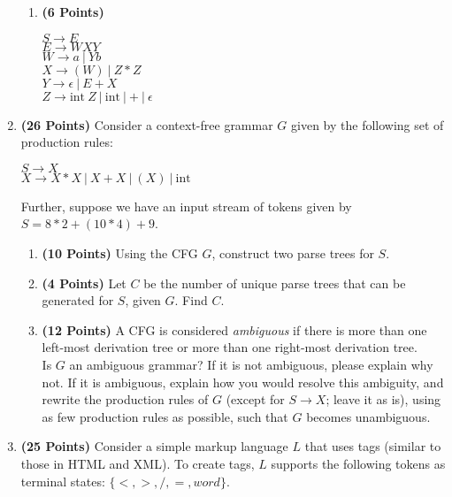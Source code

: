 \documentclass{article}[12pt]
\begin{document}
\begin{enumerate}
\begin{enumerate}
        \item \textbf{(6 Points)}
        \begin{center}
            $S \rightarrow E$\\
            $E \rightarrow WXY$\\
            $W \rightarrow a~|~Yb~$\\
            $X \rightarrow ( W )~|~Z * Z$\\
            $Y \rightarrow \epsilon~|~E + X$\\
            $Z \rightarrow \mathrm{int}~Z~|~\mathrm{int}~| + |~\epsilon$
        \end{center}
    \end{enumerate}

    \pagebreak
    \item \textbf{(26 Points)} Consider a context-free grammar $G$ given by the following set of production rules:
    \begin{center}
        $S \rightarrow X$\\
        $X \rightarrow X * X~|~X + X~|~( X )~|~\mathrm{int}$
    \end{center}
    Further, suppose we have an input stream of tokens given by $S = 8 * 2 + ( 10 * 4 ) + 9$.
    \begin{enumerate}
        \item \textbf{(10 Points)} Using the CFG $G$, construct two parse trees for $S$.
        \item \textbf{(4 Points)} Let $C$ be the number of unique parse trees that can be generated for $S$, given $G$. Find $C$.
        \item \textbf{(12 Points)} A CFG is considered \textit{ambiguous} if there is more than one left-most derivation tree or more than one right-most derivation tree.\\
        
        Is $G$ an ambiguous grammar? If it is not ambiguous, please explain why not. If it is ambiguous, explain how you would resolve this ambiguity, and rewrite the production rules of $G$ (except for $S \rightarrow X$; leave it as is), using as few production rules as possible, such that $G$ becomes unambiguous.
    \end{enumerate}
    
    \pagebreak
    \item \textbf{(25 Points)} Consider a simple markup language $L$ that uses tags (similar to those in HTML and XML). To create tags, $L$ supports the following tokens as terminal states: $\{<, >, /, =, word\}$.\\


\end{enumerate}
\end{document}
